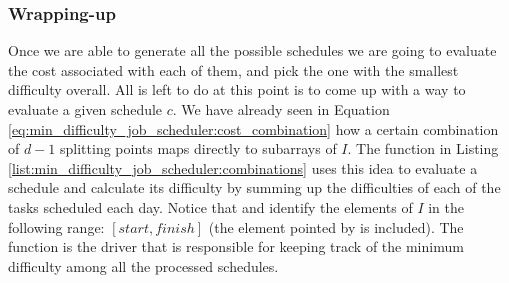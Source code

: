 


\subsubsection{Wrapping-up}
Once we are able to generate all the possible schedules we are going to evaluate the cost associated with each of them, 
and pick the one with the smallest difficulty overall. 
All is left to do at this point is to come up with a way
to evaluate a given schedule $c$. 
We have already seen in Equation
\ref{eq:min_difficulty_job_scheduler:cost_combination} how a certain combination of $d-1$ splitting
points maps directly to subarrays of $I$. The function  in Listing
\ref{list:min_difficulty_job_scheduler:combinations} uses this idea to evaluate a schedule and
calculate its difficulty by summing up the difficulties of each of the tasks scheduled each day.
Notice that  and  identify the elements of $I$ in the following range:
$[start, finish]$ (the element pointed by  is included). 
The function
 is the driver that is responsible for keeping
track of the minimum difficulty among all the processed schedules.

    


